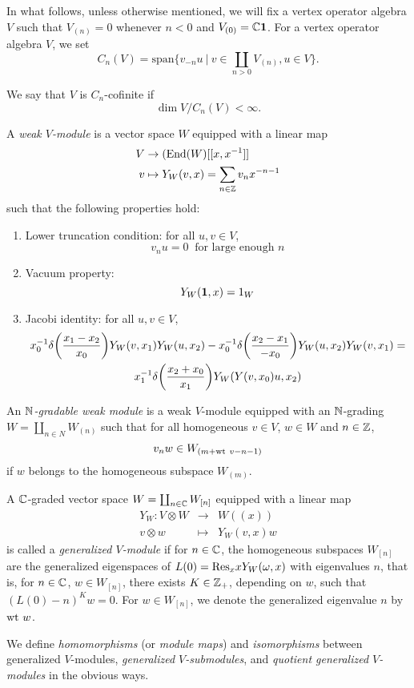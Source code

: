 \documentclass[12pt]{article}
\begin{document}
In what follows, unless otherwise mentioned, we will fix a vertex operator algebra $V$
such that $V_{(n)} = 0$ whenever $n<0$ and $V_{(0)} = \mathbb{C} \mathbf{1}$.
For a vertex operator algebra $V$, we set 
$$
  C_n(V) = \text{span} \{v_{-n}u\ |\ v\in \coprod_{n>0}V_{(n)}, u\in V \}.
$$
\begin{defn} {\rm
  We say that $V$ is $C_n$-cofinite if
  $$
    \dim V/C_n(V) < \infty.
  $$
}
\end{defn}
\begin{defn}[\cite{H2}]
  {\rm
  A \emph{weak $V$-module} is a vector space $W$ equipped with a linear map
  \begin{align*}
    V & \rightarrow (\mathrm{End}(W)[[x,x^{-1}]] \nonumber \\
    v & \mapsto Y_W(v, x) = \sum_{n\in \mathbb{Z}} v_n x^{-n-1}
  \end{align*}
  such that the following properties hold:
  \begin{enumerate}
    \item Lower truncation condition: for all $u, v\in V$,
      $$v_nu = 0 \ \text{ for large enough }n $$
    \item Vacuum property:
      $$
        Y_W(\mathbf{1}, x) = 1_W
      $$
    \item Jacobi identity: for all $u,v\in V$,
      \begin{gather*}
         x_0 ^{-1}\delta \bigg( \frac{x_1 - x_2 }{x_0 }\bigg)Y_W(v,x_1)Y_W(u,x_2)
         -x_0 ^{-1}\delta \bigg( \frac{x_2 -x_1 }{-x_0 }\bigg)Y_W(u,x_2)Y_W(v,x_1) = \\
         x_1 ^{-1}\delta \bigg( \frac{x_2 +x_0 }{x_1 }\bigg) Y_W(Y(v, x_0)u, x_2)
       \end{gather*}
    \end{enumerate}
  }
\end{defn}
\begin{defn}[\cite{Z}]
  {\rm
  An \emph{$\mathbb{N}$-gradable weak module} is a weak $V$-module equipped with
  an $\mathbb{N}$-grading $W=\coprod_{n\in N}W_{(n)}$ such that for all homogeneous
  $v\in V$, $w\in W$ and $n\in \mathbb{Z}$,
  $$
    v_n w \in W_{(m + \mbox{\rm {\scriptsize wt}}\  v - n - 1)}
  $$
  if $w$ belongs to the homogeneous subspace $W_{(m)}$.
  }
\end{defn}
\begin{defn}
{\rm A $\mathbb{C}$-graded
vector space $W=\coprod_{n\in \mathbb{C}}W_{[n]}$ equipped with
a linear map
\begin{eqnarray*}
Y_{W}: V\otimes W&\to &W((x))\\
v\otimes w&\mapsto & Y_{W}(v, x)w
\end{eqnarray*}
is called a {\it generalized $V$-module} if for $n\in \mathbb{C}$, the homogeneous
subspaces $W_{[n]}$ are the generalized eigenspaces of $L(0)=\mbox{\rm Res}_x xY_W(\omega,x)$
with eigenvalues $n$, that is, for $n\in \mathbb{C}$, $w\in W_{[n]}$,
there exists $K\in \mathbb{Z}_{+}$, depending on $w$, such that
$(L(0)-n)^{K}w=0$. For $w\in W_{[n]}$, we denote the generalized
eigenvalue $n$ by $\mbox{\rm wt}\  w$.

We define {\it homomorphisms} (or {\it module maps})
and {\it isomorphisms}  between generalized $V$-modules,
{\it generalized $V$-submodules},
and {\it quotient generalized $V$-modules}
in the obvious ways.}
\end{defn}
\end{document}
